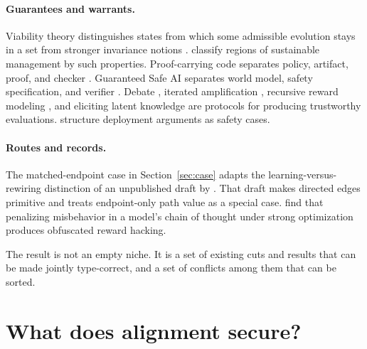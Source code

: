 \documentclass[11pt]{article}
\begin{document}
\paragraph{Guarantees and warrants.}
Viability theory distinguishes states from which some admissible evolution stays in a set from stronger invariance notions \parencite{aubin1991viability,aubin2011viability}.
\textcite{heitzig2016safeoperating} classify regions of sustainable management by such properties.
Proof-carrying code separates policy, artifact, proof, and checker \parencite{necula1997pcc}.
Guaranteed Safe AI separates world model, safety specification, and verifier \parencite{dalrymple2024gsai}.
Debate \parencite{irving2018debate}, iterated amplification \parencite{christiano2018amplifying}, recursive reward modeling \parencite{leike2018scalable}, and eliciting latent knowledge \parencite{christiano2021elk} are protocols for producing trustworthy evaluations.
\textcite{clymer2024safetycases} structure deployment arguments as safety cases.

\paragraph{Routes and records.}
The matched-endpoint case in Section~\ref{sec:case} adapts the learning-versus-rewiring distinction of an unpublished draft by \textcite{hallgren2026process}.
That draft makes directed edges primitive and treats endpoint-only path value as a special case.
\textcite{baker2025monitoring} find that penalizing misbehavior in a model's chain of thought under strong optimization produces obfuscated reward hacking.

\medskip
The result is not an empty niche.
It is a set of existing cuts and results that can be made jointly type-correct, and a set of conflicts among them that can be sorted.

\section{What does alignment secure?}
\label{sec:schema}
\end{document}
